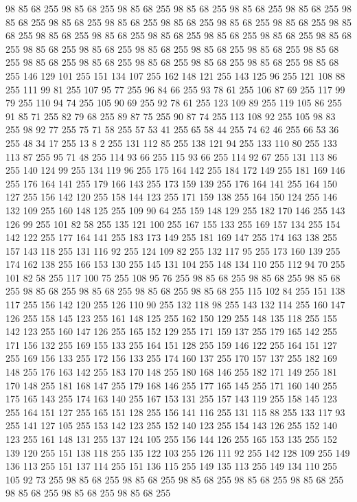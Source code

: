 98 85 68 255 98 85 68 255 98 85 68 255 98 85 68 255 98 85 68 255 98 85 68 255 98 85 68 255 98 85 68 255 98 85 68 255 98 85 68 255 98 85 68 255 98 85 68 255 98 85 68 255 98 85 68 255 98 85 68 255 98 85 68 255 98 85 68 255 98 85 68 255 98 85 68 255 98 85 68 255 98 85 68 255 98 85 68 255 98 85 68 255 98 85 68 255 98 85 68 255 98 85 68 255 98 85 68 255 98 85 68 255 98 85 68 255 98 85 68 255 98 85 68 255 146 129 101 255 151 134 107 255 162 148 121 255 143 125 96 255 121 108 88 255 111 99 81 255 107 95 77 255 96 84 66 255 93 78 61 255 106 87 69 255 117 99 79 255 110 94 74 255 105 90 69 255 92 78 61 255 123 109 89 255 119 105 86 255 91 85 71 255 82 79 68 255 89 87 75 255 90 87 74 255 113 108 92 255 105 98 83 255 98 92 77 255 75 71 58 255 57 53 41 255 65 58 44 255 74 62 46 255 66 53 36 255 48 34 17 255 13 8 2 255 131 112 85 255 138 121 94 255 133 110 80 255
133 113 87 255 95 71 48 255 114 93 66 255 115 93 66 255 114 92 67 255 131 113 86 255 140 124 99 255 134 119 96 255 175 164 142 255 184 172 149 255 181 169 146 255 176 164 141 255 179 166 143 255 173 159 139 255 176 164 141 255 164 150 127 255 156 142 120 255 158 144 123 255 171 159 138 255 164 150 124 255 146 132 109 255 160 148 125 255 109 90 64 255 159 148 129 255 182 170 146 255 143 126 99 255 101 82 58 255 135 121 100 255 167 155 133 255 169 157 134 255 154 142 122 255 177 164 141 255 183 173 149 255 181 169 147 255 174 163 138 255 157 143 118 255 131 116 92 255 124 109 82 255 132 117 95 255 173 160 139 255 174 162 138 255 166 153 130 255 145 131 104 255 148 134 110 255 112 94 70 255 101 82 58 255 117 100 75 255 108 95 76 255 98 85 68 255 98 85 68 255 98 85 68 255 98 85 68 255 98 85 68 255 98 85 68 255 98 85 68 255 115 102 84 255 151 138 117 255 156 142 120 255 126 110 90 255 132 118 98 255 143 132 114 255 160 147 126 255 158 145 123 255 161 148 125 255
162 150 129 255 148 135 118 255 155 142 123 255 160 147 126 255 165 152 129 255 171 159 137 255 179 165 142 255 171 156 132 255 169 155 133 255 164 151 128 255 159 146 122 255 164 151 127 255 169 156 133 255 172 156 133 255 174 160 137 255 170 157 137 255 182 169 148 255 176 163 142 255 183 170 148 255 180 168 146 255 182 171 149 255 181 170 148 255 181 168 147 255 179 168 146 255 177 165 145 255 171 160 140 255 175 165 143 255 174 163 140 255 167 153 131 255 157 143 119 255 158 145 123 255 164 151 127 255 165 151 128 255 156 141 116 255 131 115 88 255 133 117 93 255 141 127 105 255 153 142 123 255 152 140 123 255 154 143 126 255 152 140 123 255 161 148 131 255 137 124 105 255 156 144 126 255 165 153 135 255 152 139 120 255 151 138 118 255 135 122 103 255 126 111 92 255 142 128 109 255 149 136 113 255 151 137 114 255 151 136 115 255 149 135 113 255 149 134 110 255 105 92 73 255 98 85 68 255 98 85 68 255 98 85 68 255 98 85 68 255 98 85 68 255 98 85 68 255 98 85 68 255 98 85 68 255
